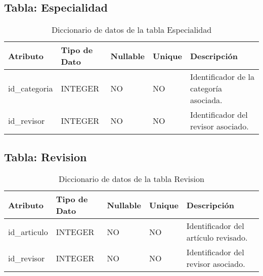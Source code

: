 \documentclass{article}
\begin{document}
\subsection{Tabla: Especialidad}
\begin{table}[H]
\centering
\begin{tabular}{|l|l|l|l|p{6cm}|}
\hline
\textbf{Atributo} & \textbf{Tipo de Dato} & \textbf{Nullable} & \textbf{Unique} & \textbf{Descripción} \\ \hline
id\_categoria & INTEGER & NO & NO & Identificador de la categoría asociada. \\ \hline
id\_revisor & INTEGER & NO & NO & Identificador del revisor asociado. \\ \hline
\end{tabular}
\caption{Diccionario de datos de la tabla Especialidad}
\label{tab:especialidad}
\end{table}

\subsection{Tabla: Revision}
\begin{table}[H]
\centering
\begin{tabular}{|l|l|l|l|p{6cm}|}
\hline
\textbf{Atributo} & \textbf{Tipo de Dato} & \textbf{Nullable} & \textbf{Unique} & \textbf{Descripción} \\ \hline
id\_articulo & INTEGER & NO & NO & Identificador del artículo revisado. \\ \hline
id\_revisor & INTEGER & NO & NO & Identificador del revisor asociado. \\ \hline
\end{tabular}
\caption{Diccionario de datos de la tabla Revision}
\label{tab:revision}
\end{table}
\end{document}
